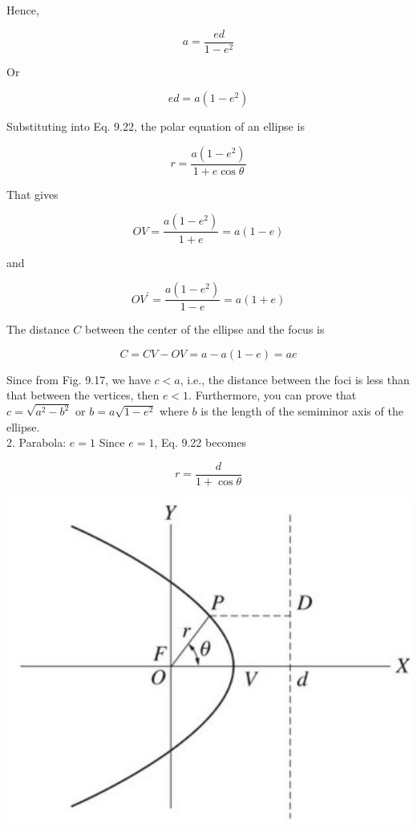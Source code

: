 \documentclass[10pt]{article}
\begin{document}
Hence,

$$
a=\frac{e d}{1-e^{2}}
$$

Or

$$
e d=a\left(1-e^{2}\right)
$$

Substituting into Eq. 9.22, the polar equation of an ellipse is

$$
r=\frac{a\left(1-e^{2}\right)}{1+e \cos \theta}
$$

That gives


\begin{equation*}
O V=\frac{a\left(1-e^{2}\right)}{1+e}=a(1-e) \tag{9.24}
\end{equation*}


and


\begin{equation*}
O V^{\prime}=\frac{a\left(1-e^{2}\right)}{1-e}=a(1+e) \tag{9.25}
\end{equation*}


The distance $C$ between the center of the ellipse and the focus is

$$
C=C V-O V=a-a(1-e)=a e
$$

Since from Fig. 9.17, we have $c<a$, i.e., the distance between the foci is less than that between the vertices, then $e<1$. Furthermore, you can prove that $c=\sqrt{a^{2}-b^{2}}$ or $b=a \sqrt{1-e^{2}}$ where $b$ is the length of the semiminor axis of the ellipse.\\
2. Parabola: $e=1$ Since $e=1$, Eq. 9.22 becomes

$$
r=\frac{d}{1+\cos \theta}
$$

\begin{center}
\includegraphics[max width=\textwidth]{2024_09_13_db1f357d2aad0a03eb2eg-153}
\end{center}
\end{document}
